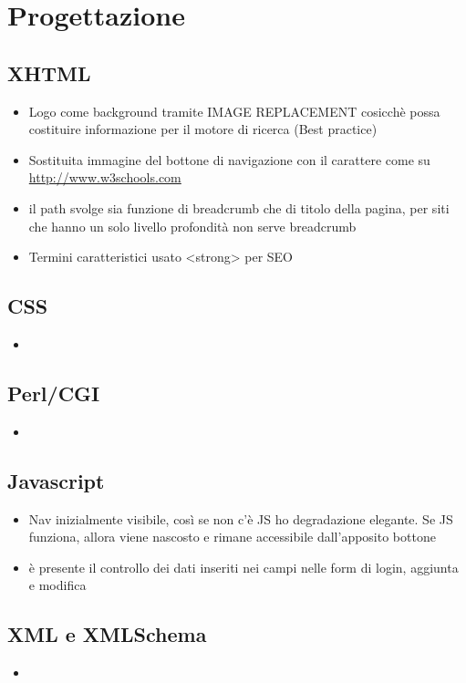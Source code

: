\documentclass[../relazione.tex]{subfiles}
\begin{document}
\section{Progettazione}
	\subsection{XHTML}
	\begin{itemize}
		\item Logo come background tramite IMAGE REPLACEMENT cosicchè possa costituire informazione per il motore di ricerca (Best practice)
		\item Sostituita immagine del bottone di navigazione con il carattere come su \url{http://www.w3schools.com}
		\item il path svolge sia funzione di breadcrumb che di titolo della pagina, per siti che hanno un solo livello profondità non serve breadcrumb
		\item Termini caratteristici usato <strong> per SEO
	\end{itemize}
	\subsection{CSS}
	\begin{itemize}
		\item 
	\end{itemize}
	\subsection{Perl/CGI}
	\begin{itemize}
		\item 
	\end{itemize}
	\subsection{Javascript}
	\begin{itemize}
		\item Nav inizialmente visibile, così se non c'è JS ho degradazione elegante. Se JS funziona, allora viene nascosto e rimane accessibile dall'apposito bottone
		\item è presente il controllo dei dati inseriti nei campi nelle form di login, aggiunta e modifica
	\end{itemize}
	\subsection{XML e XMLSchema}
	\begin{itemize}
		\item 
	\end{itemize}
\end{document}
